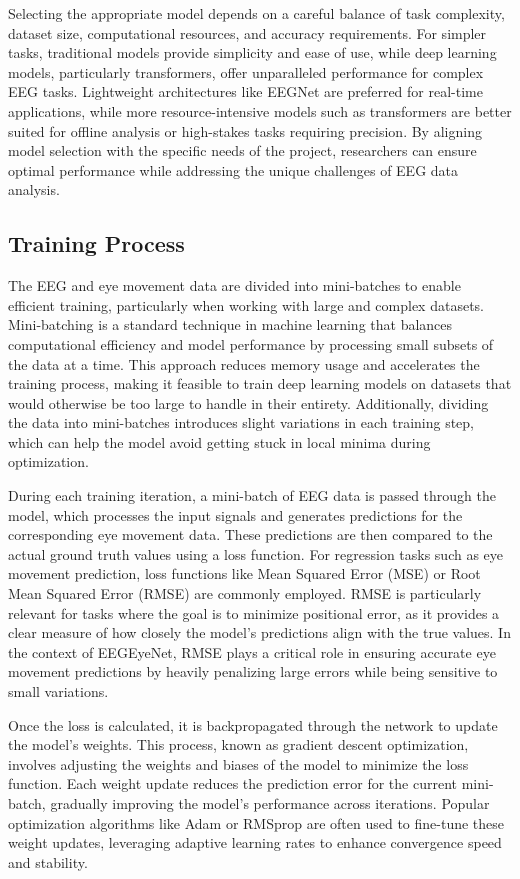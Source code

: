 \documentclass{article}
\begin{document}
Selecting the appropriate model depends on a careful balance of task complexity, dataset size, computational resources, and accuracy requirements. For simpler tasks, traditional models provide simplicity and ease of use, while deep learning models, particularly transformers, offer unparalleled performance for complex EEG tasks. Lightweight architectures like EEGNet are preferred for real-time applications, while more resource-intensive models such as transformers are better suited for offline analysis or high-stakes tasks requiring precision. By aligning model selection with the specific needs of the project, researchers can ensure optimal performance while addressing the unique challenges of EEG data analysis.

\subsection {Training Process}
The EEG and eye movement data are divided into mini-batches to enable efficient training, particularly when working with large and complex datasets. Mini-batching is a standard technique in machine learning that balances computational efficiency and model performance by processing small subsets of the data at a time. This approach reduces memory usage and accelerates the training process, making it feasible to train deep learning models on datasets that would otherwise be too large to handle in their entirety. Additionally, dividing the data into mini-batches introduces slight variations in each training step, which can help the model avoid getting stuck in local minima during optimization.

During each training iteration, a mini-batch of EEG data is passed through the model, which processes the input signals and generates predictions for the corresponding eye movement data. These predictions are then compared to the actual ground truth values using a loss function. For regression tasks such as eye movement prediction, loss functions like Mean Squared Error (MSE) or Root Mean Squared Error (RMSE) are commonly employed. RMSE is particularly relevant for tasks where the goal is to minimize positional error, as it provides a clear measure of how closely the model's predictions align with the true values. In the context of EEGEyeNet, RMSE plays a critical role in ensuring accurate eye movement predictions by heavily penalizing large errors while being sensitive to small variations.

Once the loss is calculated, it is backpropagated through the network to update the model's weights. This process, known as gradient descent optimization, involves adjusting the weights and biases of the model to minimize the loss function. Each weight update reduces the prediction error for the current mini-batch, gradually improving the model's performance across iterations. Popular optimization algorithms like Adam or RMSprop are often used to fine-tune these weight updates, leveraging adaptive learning rates to enhance convergence speed and stability.
\end{document}
